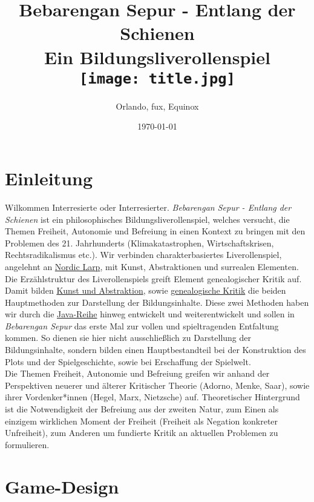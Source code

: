 \documentclass[12pt, a4paper, openany]{report}
\title{
    {Bebarengan Sepur - Entlang der Schienen}\\
    {\large{Ein Bildungsliverollenspiel}}\\
    {\bigskip}
    {\texttt{[image: title.jpg]}}\\
}
\author{Orlando, fux, Equinox}
\date{\today}
\begin{document}
\maketitle
\frontmatter
\tableofcontents
\mainmatter

\chapter{Einleitung}
Wilkommen Interresierte oder Interresierter.
\textit{Bebarengan Sepur - Entlang der Schienen} ist ein philosophisches Bildungsliverollenspiel, welches versucht, die Themen Freiheit, Autonomie und Befreiung in einen Kontext zu bringen mit den Problemen des 21. Jahrhunderts (Klimakatastrophen, Wirtschaftskrisen, Rechtsradikalismus etc.). 
Wir verbinden charakterbasiertes Liverollenspiel, angelehnt an \hyperref[nordic-larp]{Nordic Larp}, mit Kunst, Abstraktionen und surrealen Elementen. 
Die Erzählstruktur des Liverollenspiels greift Element genealogischer Kritik auf. 
Damit bilden \hyperref[kunst-abstraktion]{Kunst und Abstraktion}, sowie \hyperref[genealogische-kritik]{genealogische Kritik} die beiden Hauptmethoden zur Darstellung der Bildungsinhalte. 
Diese zwei Methoden haben wir durch die \hyperref[java-reihe]{Java-Reihe} hinweg entwickelt und weiterentwickelt und sollen in \textit{Bebarengan Sepur} das erste Mal zur vollen und spieltragenden Entfaltung kommen. 
So dienen sie hier nicht ausschließlich zu Darstellung der Bildungsinhalte, sondern bilden einen Hauptbestandteil bei der Konstruktion des Plots und der Spielgeschichte, sowie bei Erschaffung der Spielwelt.\\
Die Themen Freiheit, Autonomie und Befreiung greifen wir anhand der Perspektiven neuerer und älterer Kritischer Theorie (Adorno, Menke, Saar), sowie ihrer Vordenker*innen (Hegel, Marx, Nietzsche) auf. 
Theoretischer Hintergrund ist die Notwendigkeit der Befreiung aus der zweiten Natur, zum Einen als einzigem wirklichen Moment der Freiheit (Freiheit als Negation konkreter Unfreiheit), zum Anderen um fundierte Kritik an aktuellen Problemen zu formulieren.

\chapter{Game-Design}
\end{document}
